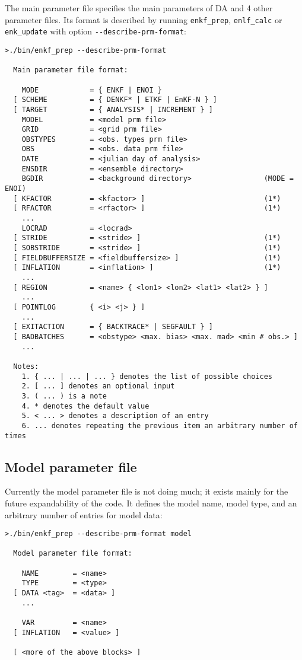\documentclass[11pt]{report}
\begin{document}
The main parameter file specifies the main parameters of DA and 4 other parameter files.
Its format is described by running \verb|enkf_prep|, \verb|enlf_calc| or \verb|enk_update| with option \verb|--describe-prm-format|:
\begin{Verbatim}[frame=single,fontsize=\footnotesize]
>./bin/enkf_prep --describe-prm-format

  Main parameter file format:

    MODE            = { ENKF | ENOI }
  [ SCHEME          = { DENKF* | ETKF | EnKF-N } ]
  [ TARGET          = { ANALYSIS* | INCREMENT } ]
    MODEL           = <model prm file>
    GRID            = <grid prm file>
    OBSTYPES        = <obs. types prm file>
    OBS             = <obs. data prm file>
    DATE            = <julian day of analysis>
    ENSDIR          = <ensemble directory>
    BGDIR           = <background directory>                 (MODE = ENOI)
  [ KFACTOR         = <kfactor> ]                            (1*)
  [ RFACTOR         = <rfactor> ]                            (1*)
    ...
    LOCRAD          = <locrad>
  [ STRIDE          = <stride> ]                             (1*)
  [ SOBSTRIDE       = <stride> ]                             (1*)
  [ FIELDBUFFERSIZE = <fieldbuffersize> ]                    (1*)
  [ INFLATION       = <inflation> ]                          (1*)
    ...
  [ REGION          = <name> { <lon1> <lon2> <lat1> <lat2> } ]
    ...
  [ POINTLOG        { <i> <j> } ]
    ...
  [ EXITACTION      = { BACKTRACE* | SEGFAULT } ]
  [ BADBATCHES      = <obstype> <max. bias> <max. mad> <min # obs.> ]
    ...

  Notes:
    1. { ... | ... | ... } denotes the list of possible choices
    2. [ ... ] denotes an optional input
    3. ( ... ) is a note
    4. * denotes the default value
    5. < ... > denotes a description of an entry
    6. ... denotes repeating the previous item an arbitrary number of times
\end{Verbatim}

\subsection{Model parameter file}

Currently the model parameter file is not doing much; it exists mainly for the future expandability of the code. 
It defines the model name, model type, and an arbitrary number of entries for model data:
\begin{Verbatim}[frame=single,fontsize=\footnotesize]
>./bin/enkf_prep --describe-prm-format model

  Model parameter file format:

    NAME        = <name>
    TYPE        = <type>
  [ DATA <tag>  = <data> ]
    ...

    VAR         = <name>
  [ INFLATION   = <value> ]

  [ <more of the above blocks> ]
\end{Verbatim}
\end{document}
